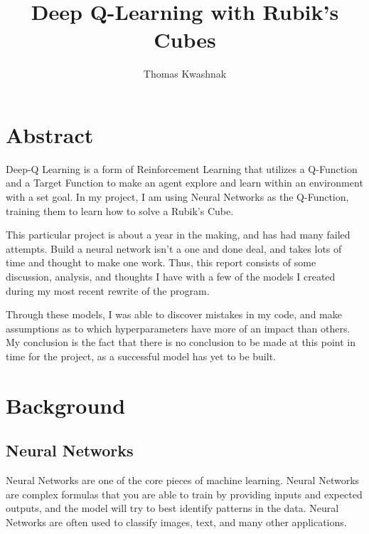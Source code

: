 \documentclass[12pt]{article}
\title{Deep Q-Learning with Rubik's Cubes}
\author{Thomas Kwashnak}
\begin{document}
\begin{titlepage}

	\maketitle

\end{titlepage}

\tableofcontents
\newpage


\section{Abstract}

Deep-Q Learning is a form of Reinforcement Learning that utilizes a Q-Function and a Target Function to make an agent explore and learn within an environment with a set goal. In my project, I am using Neural Networks as the Q-Function, training them to learn how to solve a Rubik's Cube.

This particular project is about a year in the making, and has had many failed attempts. Build a neural network isn't a one and done deal, and takes lots of time and thought to make one work. Thus, this report consists of some discussion, analysis, and thoughts I have with a few of the models I created during my most recent rewrite of the program.

Through these models, I was able to discover mistakes in my code, and make assumptions as to which hyperparameters have more of an impact than others. My conclusion is the fact that there is no conclusion to be made at this point in time for the project, as a successful model has yet to be built.

\newpage

\section{Background}

\subsection{Neural Networks}

Neural Networks are one of the core pieces of machine learning. Neural Networks are complex formulas that you are able to train by providing inputs and expected outputs, and the model will try to best identify patterns in the data. Neural Networks are often used to classify images, text, and many other applications.
\end{document}

